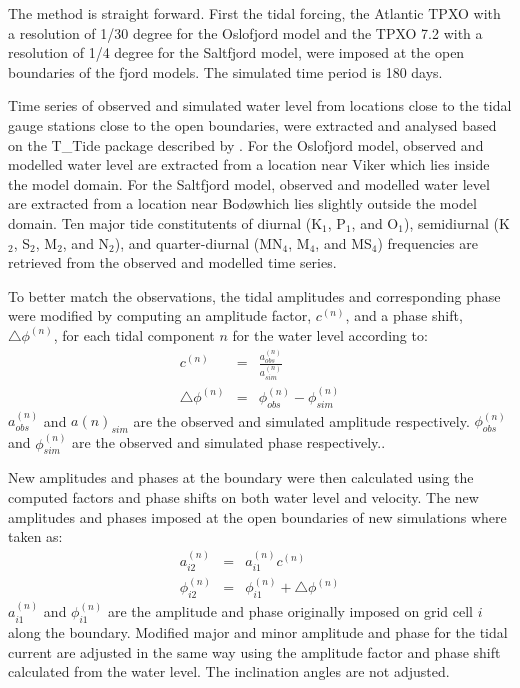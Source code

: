 The method is straight forward. First the tidal forcing, the Atlantic TPXO with a resolution of 1/30 degree for the Oslofjord model and the TPXO 7.2 with a resolution of 1/4 degree for the Saltfjord model, were imposed at the open boundaries of the fjord models. The simulated time period is 180 days. 

Time series of observed and simulated water level from locations close to the tidal gauge stations close to the open boundaries, were extracted and analysed based on the T\_Tide package described by \cite{pawlowicz02}. For the Oslofjord model, observed and modelled water level are extracted from a location near Viker which lies inside the model domain. For the Saltfjord model, observed and modelled water level are extracted from a location near Bod\o which lies slightly outside the model domain. Ten major tide constitutents of diurnal (K$_1$, P$_1$, and O$_1$), semidiurnal (K$_2$, S$_2$, M$_2$, and N$_2$), and quarter-diurnal (MN$_4$, M$_4$, and MS$_4$) frequencies are retrieved from the observed and modelled time series. 

To better match the observations, the tidal amplitudes and corresponding phase were modified by computing an amplitude factor, $c^{(n)}$, and a phase shift, $\triangle \phi^{(n)}$, for each tidal component $n$ for the water level according to:
\begin{eqnarray}
c^{(n)} &=& \frac{a^{(n)}_{obs}}{a^{(n)}_{sim}} \\
\triangle \phi^{(n)} &=& \phi^{(n)}_{obs} - \phi^{(n)}_{sim}
\end{eqnarray}
$a^{(n)}_{obs}$ and $a{(n)}_{sim}$ are the observed and simulated amplitude respectively. $\phi^{(n)}_{obs}$ and $\phi^{(n)}_{sim}$ are the observed and simulated phase respectively.. 

New amplitudes and phases at the boundary were then calculated using the computed factors and phase shifts on both water level and velocity. The new amplitudes and phases imposed at the open boundaries of new simulations where taken as:
\begin{eqnarray}
a^{(n)}_{i2} &=& a^{(n)}_{i1} c^{(n)} \\
\phi^{(n)}_{i2} &=& \phi^{(n)}_{i1} + \triangle \phi^{(n)}
\end{eqnarray}
$a^{(n)}_{i1}$ and $\phi^{(n)}_{i1}$ are the amplitude and phase originally imposed on grid cell $i$ along the boundary. Modified major and minor amplitude and phase for the tidal current are adjusted in the same way using the amplitude factor and phase shift calculated from the water level. The inclination angles are not adjusted.

